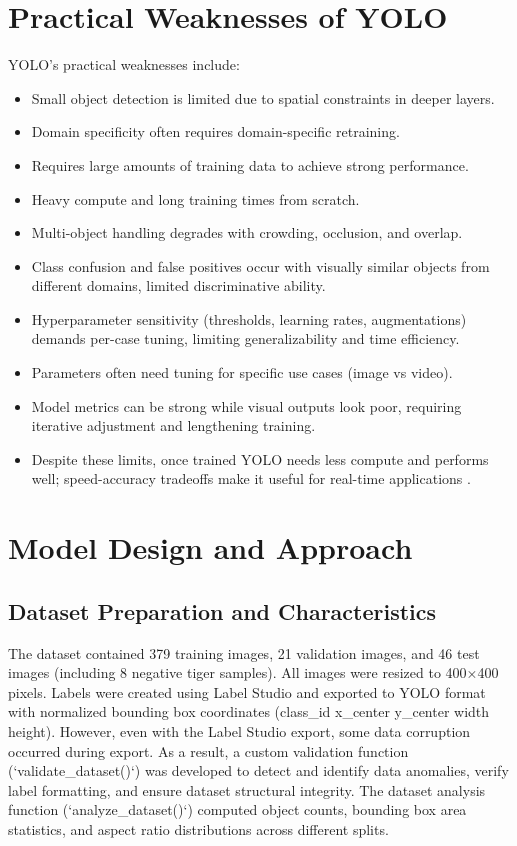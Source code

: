\documentclass[conference]{IEEEtran}
\begin{document}
\section{Practical Weaknesses of YOLO}

YOLO's practical weaknesses include:
\begin{itemize}
\item Small object detection is limited due to spatial constraints in deeper layers.
\item Domain specificity often requires domain-specific retraining.
\item Requires large amounts of training data to achieve strong performance.
\item Heavy compute and long training times from scratch.
\item Multi-object handling degrades with crowding, occlusion, and overlap.
\item Class confusion and false positives occur with visually similar objects from different domains, limited discriminative ability.
\item Hyperparameter sensitivity (thresholds, learning rates, augmentations) demands per-case tuning, limiting generalizability and time efficiency.
\item Parameters often need tuning for specific use cases (image vs video).
\item Model metrics can be strong while visual outputs look poor, requiring iterative adjustment and lengthening training.
\item Despite these limits, once trained YOLO needs less compute and performs well; speed-accuracy tradeoffs make it useful for real-time applications \cite{b3}.
\end{itemize}%

\section{Model Design and Approach}

\subsection{Dataset Preparation and Characteristics}

The dataset contained 379 training images, 21 validation images, and 46 test images (including 8 negative tiger samples). All images were resized to 400×400 pixels. Labels were created using Label Studio and exported to YOLO format with normalized bounding box coordinates (class\_id x\_center y\_center width height). However, even with the Label Studio export, some data corruption occurred during export. As a result, a custom validation function (`validate\_dataset()`) was developed to detect and identify data anomalies, verify label formatting, and ensure dataset structural integrity. The dataset analysis function (`analyze\_dataset()`) computed object counts, bounding box area statistics, and aspect ratio distributions across different splits.
\end{document}
